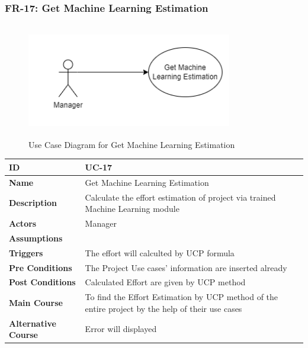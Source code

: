     \newpage

    \subsubsection{FR-17: Get Machine Learning Estimation}
    \begin{figure}[H]
        \includegraphics[height=5cm, width=0.8\textwidth]{./diagrams/Use Case/u17.png}
        \centering 
        \caption{Use Case Diagram for Get Machine Learning Estimation}
        \label{fig:Usecase1}
        \end{figure}
        
    \begin{center}
        \begin{tabularx}{\textwidth}{|l|X|}
            \hline
            \textbf{ID} & UC-17 \\
            \hline
            \textbf{Name} & Get Machine Learning Estimation \\
            \hline
            \textbf{Description} & Calculate the effort estimation of project via trained Machine Learning module \\
            \hline
            \textbf{Actors} & Manager  \\
            \hline
            \textbf{Assumptions} &  \\
            \hline
            \textbf{Triggers} & The effort will calculted by UCP formula \\
            \hline
            \textbf{Pre Conditions} & The Project Use cases' information are inserted already \\
            \hline
            \textbf{Post Conditions} & Calculated Effort are given by UCP method  \\
            \hline
            \textbf{Main Course} & To find the Effort Estimation by UCP method of the entire project by the help of their use cases \\
            \hline
            \textbf{Alternative Course} & Error will displayed \\
            \hline
            
        \end{tabularx}
    \end{center}
    \newpage
    

